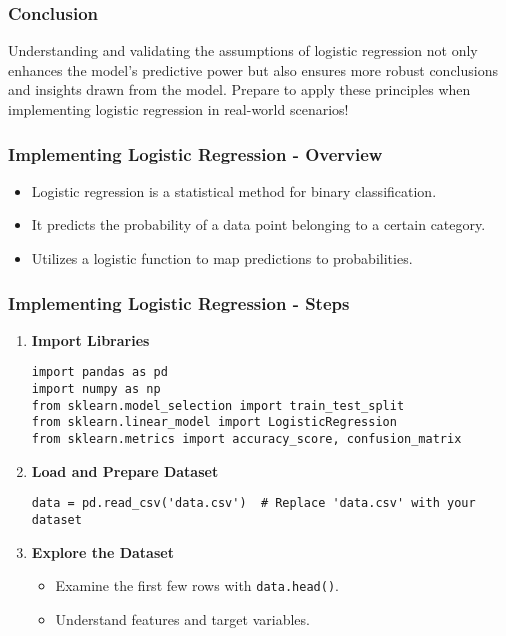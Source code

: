 \documentclass[aspectratio=169]{beamer}
\begin{document}
\begin{frame}[fragile]
    \frametitle{Conclusion}
    Understanding and validating the assumptions of logistic regression not only enhances the model's predictive power but also ensures more robust conclusions and insights drawn from the model. 
    Prepare to apply these principles when implementing logistic regression in real-world scenarios!
\end{frame}

\begin{frame}[fragile]
    \frametitle{Implementing Logistic Regression - Overview}
    \begin{itemize}
        \item Logistic regression is a statistical method for binary classification.
        \item It predicts the probability of a data point belonging to a certain category.
        \item Utilizes a logistic function to map predictions to probabilities.
    \end{itemize}
\end{frame}

\begin{frame}[fragile]
    \frametitle{Implementing Logistic Regression - Steps}
    \begin{enumerate}
        \item \textbf{Import Libraries}
            \begin{lstlisting}
import pandas as pd
import numpy as np
from sklearn.model_selection import train_test_split
from sklearn.linear_model import LogisticRegression
from sklearn.metrics import accuracy_score, confusion_matrix
            \end{lstlisting}
        \item \textbf{Load and Prepare Dataset}
            \begin{lstlisting}
data = pd.read_csv('data.csv')  # Replace 'data.csv' with your dataset
            \end{lstlisting}
        \item \textbf{Explore the Dataset}
            \begin{itemize}
                \item Examine the first few rows with \texttt{data.head()}.
                \item Understand features and target variables.
            \end{itemize}
    \end{enumerate}
\end{frame}
\end{document}

